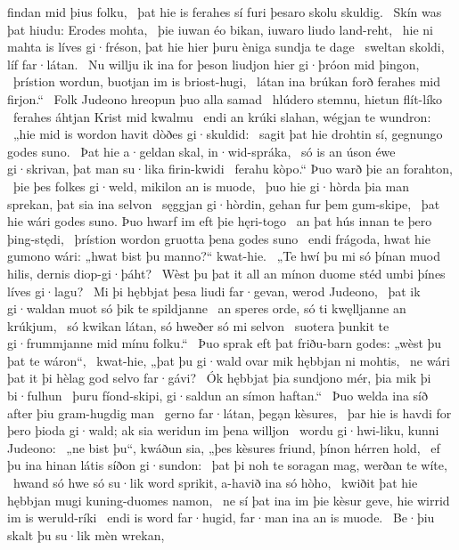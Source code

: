 findan mid þius folku, \hld\ þat hie is ferahes sí
furi þesaro skolu skuldig. \hld\ Skín was þat hiudu:
Erodes mohta, \hld\ þie iuwan éo bikan,
iuwaro liudo land-reht, \hld\ hie ni mahta is líves gi·fréson,
þat hie hier þuru èniga sundja te dage \hld\ sweltan skoldi,
líf far·látan. \hld\ Nu willju ik ina for þeson liudjon hier
gi·þróon mid þingon, \hld\ þrístion wordun,
buotjan im is briost-hugi, \hld\ látan ina brúkan forð
ferahes mid firjon.“ \hld\ Folk Judeono
hreopun þuo alla samad \hld\ hlúdero stemnu,
hietun flít-líko \hld\ ferahes áhtjan
Krist mid kwalmu \hld\ endi an krúki slahan,
wégjan te wundron: \hld\ „hie mid is wordon havit
dòðes gi·skuldid: \hld\ sagit þat hie drohtin sí,
gegnungo godes suno. \hld\ Þat hie a·geldan skal,
in·wid-spráka, \hld\ só is an úson éwe gi·skrivan,
þat man su·lika firin-kwidi \hld\ ferahu kòpo.“
Þuo warð þie an forahton, \hld\ þie þes folkes gi·weld,
mikilon an is muode, \hld\ þuo hie gi·hòrda þia man sprekan,
þat sia ina selvon \hld\ sęggjan gi·hòrdin,
gehan fur þem gum-skipe, \hld\ þat hie wári godes suno.
Þuo hwarf im eft þie hęri-togo \hld\ an þat hús innan
te þero þing-stędi, \hld\ þrístion wordon
gruotta þena godes suno \hld\ endi frágoda, hwat hie gumono wári:
„hwat bist þu manno?“ kwat-hie. \hld\ „Te hwí þu mi só þínan muod hilis,
dernis diop-gi·þáht? \hld\ Wèst þu þat it all an mínon duome stéd %
umbi þínes líves gi·lagu? \hld\ Mi þi hębbjat þesa liudi far·gevan,
werod Judeono, \hld\ þat ik gi·waldan muot
só þik te spildjanne \hld\ an speres orde,
só ti kwęlljanne an krúkjum, \hld\ só kwikan látan,
só hweðer só mi selvon \hld\ suotera þunkit
te gi·frummjanne mid mínu folku.“ \hld\ Þuo sprak eft þat friðu-barn godes:
„wèst þu þat te wáron“, \hld\ kwat-hie, „þat þu gi·wald ovar mik
hębbjan ni mohtis, \hld\ ne wári þat it þi hèlag god
selvo far·gávi? \hld\ Ók hębbjat þia sundjono mér,
þia mik þi bi·fulhun \hld\ þuru fíond-skipi,
gi·saldun an símon haftan.“ \hld\ Þuo welda ina síð after þiu
gram-hugdig man \hld\ gerno far·látan,
þegạn kèsures, \hld\ þar hie is havdi for þero þioda gi·wald;
ak sia weridun im þena willjon \hld\ wordu gi·hwi-liku,
kunni Judeono: \hld\ „ne bist þu“, kwáðun sia, „þes kèsures friund,
þínon hérren hold, \hld\ ef þu ina hinan látis
síðon gi·sundon: \hld\ þat þi noh te soragan mag,
werðan te wíte, \hld\ hwand só hwe só su·lik word sprikit,
a-havið ina só hòho, \hld\ kwiðit þat hie hębbjan mugi
kuning-duomes namon, \hld\ ne sí þat ina im þie kèsur geve,
hie wirrid im is weruld-ríki \hld\ endi is word far·hugid,
far·man ina an is muode. \hld\ Be·þiu skalt þu su·lik mèn wrekan,
